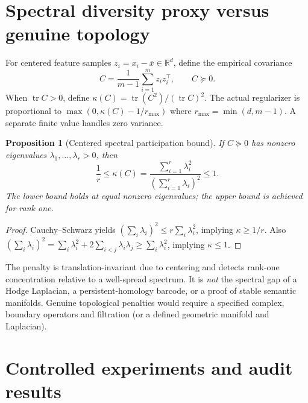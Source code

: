 \documentclass[11pt,a4paper]{article}
\theoremstyle{plain}\newtheorem{theorem}{Theorem}[section]\newtheorem{proposition}[theorem]{Proposition}\newtheorem{lemma}[theorem]{Lemma}
\theoremstyle{definition}\newtheorem{definition}[theorem]{Definition}\newtheorem{remark}[theorem]{Remark}\newtheorem{counterexample}[theorem]{Counterexample}
\newcommand{\R}{\mathbb R}\newcommand{\C}{\mathbb C}\newcommand{\Z}{\mathbb Z}\newcommand{\EE}{\mathbb E}\newcommand{\norm}[1]{\left\lVert #1\right\rVert}\newcommand{\tr}{\operatorname{tr}}\newcommand{\rank}{\operatorname{rank}}\newcommand{\diag}{\operatorname{diag}}\newcommand{\softmax}{\operatorname{softmax}}\newcommand{\Span}{\operatorname{span}}\newcommand{\NOTE}{\textsc{Status:}}
\begin{document}
\section{Spectral diversity proxy versus genuine topology}
For centered feature samples $z_i=x_i-\bar x\in\R^d$, define the empirical covariance
\begin{equation}
 C=\frac1{m-1}\sum_{i=1}^m z_iz_i^\top,\qquad C\succeq0.
\end{equation}
When $\tr C>0$, define $\kappa(C)=\tr(C^2)/(\tr C)^2$. The actual regularizer is proportional to $\max(0,\kappa(C)-1/r_{\max})$ where $r_{\max}=\min(d,m-1)$. A separate finite value handles zero variance.
\begin{proposition}[Centered spectral participation bound]\label{th:rank}
If $C\succeq0$ has nonzero eigenvalues $\lambda_1,\dots,\lambda_r>0$, then
\begin{equation}
 \frac1r\le\kappa(C)=\frac{\sum_{i=1}^r\lambda_i^2}{(\sum_{i=1}^r\lambda_i)^2}\le1.
\end{equation}
The lower bound holds at equal nonzero eigenvalues; the upper bound is achieved for rank one.
\end{proposition}
\begin{proof}
Cauchy--Schwarz yields $(\sum_i\lambda_i)^2\le r\sum_i\lambda_i^2$, implying $\kappa\ge1/r$. Also $(\sum_i\lambda_i)^2=\sum_i\lambda_i^2+2\sum_{i<j}\lambda_i\lambda_j\ge\sum_i\lambda_i^2$, implying $\kappa\le1$.
\end{proof}
The penalty is translation-invariant due to centering and detects rank-one concentration relative to a well-spread spectrum. It is \emph{not} the spectral gap of a Hodge Laplacian, a persistent-homology barcode, or a proof of stable semantic manifolds. Genuine topological penalties would require a specified complex, boundary operators and filtration (or a defined geometric manifold and Laplacian).

\section{Controlled experiments and audit results}
\end{document}

